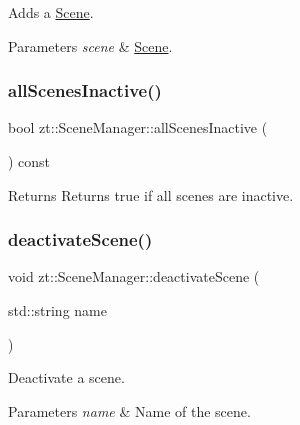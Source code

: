 Adds a \hyperlink{classzt_1_1_scene}{Scene}. 


\begin{DoxyParams}{Parameters}
{\em scene} & \hyperlink{classzt_1_1_scene}{Scene}. \\
\hline
\end{DoxyParams}
\mbox{\label{classzt_1_1_scene_manager_a9b84c499ed47c2f58ef6e7ea8edba296}} 
\subsubsection{\texorpdfstring{all\+Scenes\+Inactive()}{allScenesInactive()}}
{\footnotesize\ttfamily bool zt\+::\+Scene\+Manager\+::all\+Scenes\+Inactive (\begin{DoxyParamCaption}{ }\end{DoxyParamCaption}) const}

\begin{DoxyReturn}{Returns}
Returns true if all scenes are inactive. 
\end{DoxyReturn}
\mbox{\label{classzt_1_1_scene_manager_a6adb888b88566305c08f1b57b33dbb83}} 
\subsubsection{\texorpdfstring{deactivate\+Scene()}{deactivateScene()}}
{\footnotesize\ttfamily void zt\+::\+Scene\+Manager\+::deactivate\+Scene (\begin{DoxyParamCaption}\item[{std\+::string}]{name }\end{DoxyParamCaption})}



Deactivate a scene. 


\begin{DoxyParams}{Parameters}
{\em name} & Name of the scene. \\
\hline
\end{DoxyParams}
\mbox{\label{classzt_1_1_scene_manager_a8587fc624ef29ac0d71ff72a8a653066}} 
